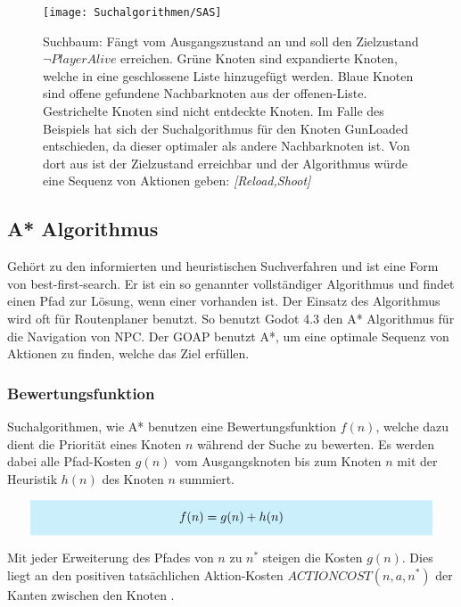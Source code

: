 \begin{figure}[h]
  \centering
  \texttt{[image: Suchalgorithmen/SAS]}
	\captionsetup{justification=justified, format=plain}
  \caption{Suchbaum: Fängt vom Ausgangszustand an und soll den Zielzustand $\lnot \textit{PlayerAlive}$ erreichen. Grüne Knoten sind expandierte Knoten, welche in eine geschlossene Liste hinzugefügt werden. Blaue Knoten sind offene gefundene Nachbarknoten aus der offenen-Liste. Gestrichelte Knoten sind nicht entdeckte Knoten. Im Falle des Beispiels hat sich der Suchalgorithmus für den Knoten GunLoaded entschieden, da dieser optimaler als andere Nachbarknoten ist. Von dort aus ist der Zielzustand erreichbar und der Algorithmus würde eine Sequenz von Aktionen geben: \textit{[Reload,Shoot]}}
  \label{Suchalgorithmen}
\end{figure}
\clearpage

\subsection{A* Algorithmus}

Gehört zu den informierten und heuristischen Suchverfahren und ist eine Form von best-first-search. Er ist ein so genannter vollständiger Algorithmus und findet einen Pfad zur Lösung, wenn einer vorhanden ist. Der Einsatz des Algorithmus wird oft für Routenplaner benutzt. So benutzt Godot 4.3 den A* Algorithmus für die Navigation von NPC. Der GOAP benutzt A*, um eine optimale Sequenz von Aktionen zu finden, welche das Ziel erfüllen.

\subsubsection{Bewertungsfunktion}

Suchalgorithmen, wie A* benutzen eine Bewertungsfunktion $f(n)$, welche dazu dient die Priorität eines Knoten $n$ während der Suche zu bewerten. Es werden dabei alle Pfad-Kosten $g(n)$ vom Ausgangsknoten bis zum Knoten $n$ mit der Heuristik $h(n)$ des Knoten $n$ summiert.

\[
\highlightbox{0.9\textwidth}{$
    \begin{aligned}
			f(n) = g(n) + h(n)
    \end{aligned}
$}
\]

Mit jeder Erweiterung des Pfades von $n$ zu $n^{\ast}$ steigen die Kosten $g(n)$. Dies liegt an den positiven tatsächlichen Aktion-Kosten $ACTIONCOST(n,a,n^*)$ der Kanten zwischen den Knoten .

